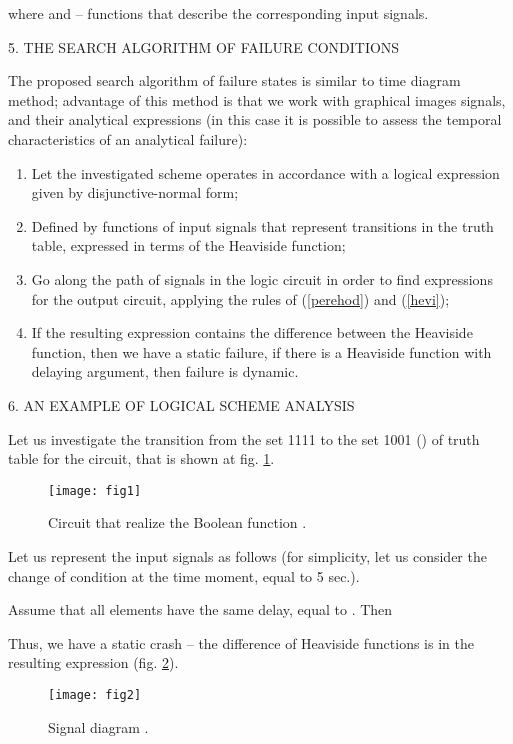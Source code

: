 \documentclass[12pt]{article}
\newcommand{\reff}[1]{(\ref{#1})}
\newcommand{\refp}[1]{fig. \ref{#1}}
\begin{document}
where  and  -- functions that describe the corresponding input
signals.

\begin{center}
   5. THE SEARCH ALGORITHM OF FAILURE CONDITIONS
\end{center}

The proposed search algorithm of failure states is similar to time diagram
method; advantage of this method is that we work with graphical images signals,
and their analytical expressions (in this case it is possible to assess the
temporal characteristics of an analytical failure):
\begin{enumerate}
   \item Let the investigated scheme operates in accordance with a
   logical expression given by disjunctive-normal form;
   \item Defined by functions of input signals that represent transitions in the
   truth table, expressed in terms of the Heaviside function;
   \item Go along the path of signals in the logic circuit in order to find
   expressions for the output circuit, applying the rules of \reff{perehod} and
   \reff{hevi};
   \item If the resulting expression contains the difference between the
   Heaviside function, then we have a static failure, if there is a Heaviside
   function with delaying argument, then failure is dynamic.
\end{enumerate}

\begin{center}
   6. AN EXAMPLE OF LOGICAL SCHEME ANALYSIS
\end{center}

Let us investigate the transition from the set 1111 to the set 1001
() of truth table for the circuit, that is shown at
\refp{picsh}.
\begin{figure}[ht]
   \centering
   \texttt{[image: fig1]}
   \caption{Circuit that realize the Boolean function
      .}
   \label{picsh}
\end{figure}
Let us represent the input signals as follows (for simplicity, let us consider
the change of condition at the time moment, equal to 5 sec.).

Assume that all elements have the same delay, equal to . Then

Thus, we have a static crash -- the difference of Heaviside functions is in the
resulting expression (\refp{stat}).
\begin{figure}[ht]
   \centering
   \texttt{[image: fig2]}
   \caption{Signal diagram .}
   \label{stat}
\end{figure}
\end{document}

